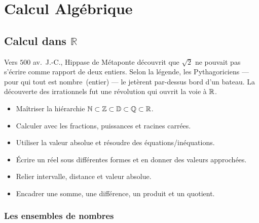 \part{Calcul Alg\'ebrique}

\chapter{Calcul dans $\mathbb{R}$}


\begin{anecdote}
Vers $500$ av.\ J.-C., Hippase de M\'etaponte d\'ecouvrit que $\sqrt{2}$ ne pouvait
pas s'\'ecrire comme rapport de deux entiers. Selon la l\'egende, les Pythagoriciens
--- pour qui \og tout est nombre\fg\ (entier) --- le jet\`erent par-dessus bord d'un
bateau. La d\'ecouverte des irrationnels fut une r\'evolution qui ouvrit la voie \`a $\mathbb{R}$.
\end{anecdote}

\begin{objectifs}
\begin{itemize}
  \item Ma\^itriser la hi\'erarchie $\mathbb{N} \subset \mathbb{Z} \subset \mathbb{D} \subset \mathbb{Q} \subset \mathbb{R}$.
  \item Calculer avec les fractions, puissances et racines carr\'ees.
  \item Utiliser la valeur absolue et r\'esoudre des \'equations/in\'equations.
  \item \'Ecrire un r\'eel sous diff\'erentes formes et en donner des valeurs approch\'ees.
  \item Relier intervalle, distance et valeur absolue.
  \item Encadrer une somme, une diff\'erence, un produit et un quotient.
\end{itemize}
\end{objectifs}

\section{Les ensembles de nombres}

